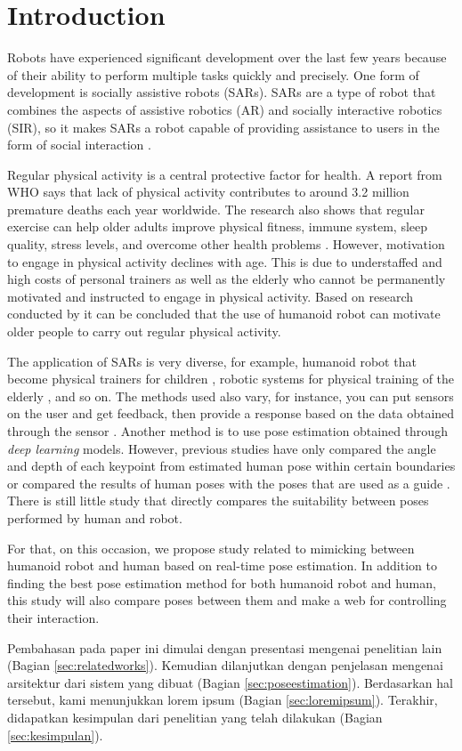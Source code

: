 \section{Introduction}
\label{sec:introduction}


Robots have experienced significant development over the last few years 
because of their ability to perform multiple tasks quickly and precisely.
One form of development is socially assistive robots (SARs). 
SARs are a type of robot that combines the aspects of assistive robotics (AR)
and socially interactive robotics (SIR), so it makes SARs a robot capable of providing assistance to users in the form of social interaction \citep{feil2005}.

Regular physical activity is a central protective factor for health.
A report from WHO says that lack of physical activity contributes to around 3.2 million premature deaths each year worldwide.
The research also shows that regular exercise can help older adults improve physical fitness, immune system, sleep quality, stress levels, and overcome other health problems \citep{lotfi2018}.
However, motivation to engage in physical activity declines with age. 
This is due to understaffed and high costs of personal trainers as well as the elderly who cannot be permanently motivated and instructed to engage in physical activity.
Based on research conducted by \citet{ruf2020} it can be concluded that the use of humanoid robot can motivate older people to carry out regular physical activity.

The application of SARs is very diverse, for example, humanoid robot that become physical trainers for children \citep{güneysu2017}, 
robotic systems for physical training of the elderly \citep{avioz2021}, and so on. The methods used also vary, for instance, 
you can put sensors on the user and get feedback, then provide a response based on the data obtained through the sensor \citep{güneysu2017}. 
Another method is to use pose estimation obtained through \emph{deep learning} models.
However, previous studies have only compared the angle and depth of each keypoint from estimated human pose within certain boundaries or compared the results of human poses with the poses that are used as a guide \citep{romeo}.
There is still little study that directly compares the suitability between poses performed by human and robot.

For that, on this occasion, we propose study related to mimicking between humanoid robot and human based on real-time pose estimation. 
In addition to finding the best pose estimation method for both humanoid robot and human, this study will also compare poses between them and make a web for controlling their interaction.

Pembahasan pada paper ini dimulai dengan presentasi mengenai penelitian lain (Bagian \ref{sec:relatedworks}).
Kemudian dilanjutkan dengan penjelasan mengenai arsitektur dari sistem yang dibuat (Bagian \ref{sec:poseestimation}).
Berdasarkan hal tersebut, kami menunjukkan lorem ipsum (Bagian \ref{sec:loremipsum}).
Terakhir, didapatkan kesimpulan dari penelitian yang telah dilakukan (Bagian \ref{sec:kesimpulan}).

